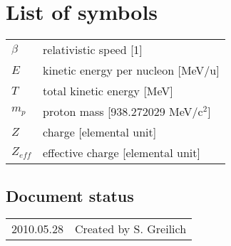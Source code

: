 
\chapter{List of symbols}

\begin{tabular}{l l}

$\beta$ & relativistic speed [1] \\
$E$ & kinetic energy per nucleon [MeV/u] \\
$T$ & total kinetic energy [MeV] \\
$m_p$ & proton mass [938.272029 MeV/c$^2$] \\
$Z$ & charge [elemental unit] \\
$Z_{eff}$ & effective charge [elemental unit] \\
\end{tabular}


\section*{Document status}
\begin{tabular}{l l}
2010.05.28&Created by S. Greilich
\end{tabular}